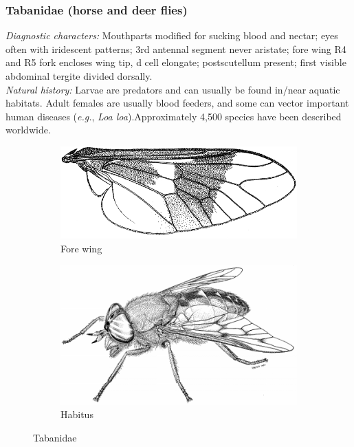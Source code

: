 \documentclass[letterpaper, 11pt]{article}
\begin{document}
\subsubsection{Tabanidae (horse and deer flies)}
\noindent{}\textit{Diagnostic characters:} Mouthparts modified for sucking blood and nectar; eyes often with iridescent patterns; 3rd antennal segment never aristate; fore wing R4 and R5 fork encloses wing tip, d cell elongate; postscutellum present; first visible abdominal tergite divided dorsally.\\

\noindent{}\textit{Natural history:} Larvae are predators and can usually be found in/near aquatic habitats. Adult females are usually blood feeders, and some can vector important human diseases (\textit{e.g.}, \textit{Loa loa}).Approximately 4,500 species have been described worldwide.

\begin{figure}[ht!]
    \centering
    \begin{subfigure}[ht!]{0.4\textwidth}
        \includegraphics[width=\textwidth]{TabanidWing}
        \caption{Fore wing \citep[][Fig. 31.35]{mcalpine1981manual}}
        \label{fig:tabanid1}
    \end{subfigure}
    \qquad
    \begin{subfigure}[ht!]{0.5\textwidth}
        \includegraphics[width=\textwidth]{TabanidHabitus}
        \caption{Habitus \citep[][Fig. 31.1]{mcalpine1981manual}}
        \label{fig:tabanid2}
    \end{subfigure}
    \caption{Tabanidae}\label{fig:tabanids}
\end{figure}
\end{document}
